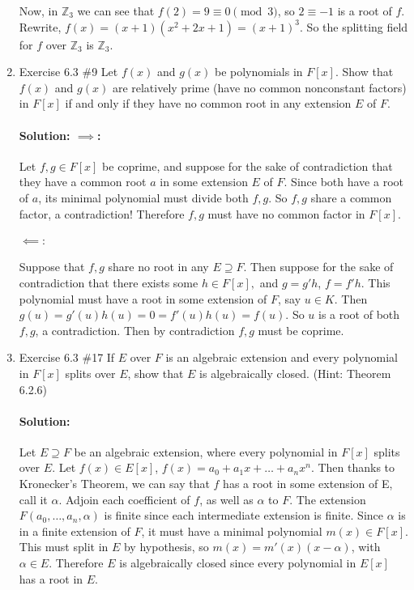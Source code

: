 \documentclass{article}
\begin{document}
\begin{enumerate}
Now, in $\mathbb{Z}_3$ we can see that $f(2)=9\equiv 0\pmod{3} $, so $2\equiv -1$ is a root of $f$. Rewrite, $f(x)=(x+1)(x^2+2x+1)=(x+1)^3$. So the splitting field
for $f$ over $\mathbb{Z}_3$ is $\mathbb{Z}_3$.

\newpage
\item Exercise 6.3 \#9 Let $f(x)$ and $g(x)$ be polynomials in $F[x].$ Show that $f(x)$ and $g(x)$
are relatively prime (have no common nonconstant factors) in $F[x]$ if and only if
they have no common root in any extension $E$ of $F.$

\paragraph{Solution: $\implies$: }
Let $f,g\in F[x]$ be coprime, and suppose for the sake of contradiction that they have a common root $a$
in some extension $E$ of $F$. Since both have a root of $a$, its minimal polynomial must divide both $f,g$.
So $f,g$ share a common factor, a contradiction!
Therefore $f,g$ must have no common factor in $F[x]$.
\paragraph{$\impliedby:$ }
Suppose that $f,g $ share no root in any $E\supseteq F$. Then suppose for the sake of contradiction that there exists some $h\in F[x],$ and $g=g'h$, $f=f'h$.
This polynomial must have a root in some extension of $F$, say $u\in K$. Then $g(u)=g'(u)h(u)=0=f'(u)h(u)=f(u)$. So $u$ is a root of both $f,g$, a contradiction. Then by contradiction
$f,g$ must be coprime. %

\item Exercise 6.3 \#17 If $E$ over $F$ is an algebraic extension and every polynomial in
$F[x]$ splits over $E$, show that $E$ is algebraically closed. (Hint: Theorem 6.2.6)

\paragraph{Solution: }Let $E\supseteq F$ be an algebraic extension, where every polynomial in $F[x]$ splits over $E$. 
Let $f(x)\in E[x]$, $f(x)=a_0+a_1x+\ldots+a_nx^{n}$.
Then thanks to Kronecker's Theorem, we can say that $f$ has a root in some extension of E, call it $\alpha$.
Adjoin each coefficient of $f$, as well as $\alpha$ to $F$. The extension $F(a_0,\ldots,a_n,\alpha)$ 
is finite since each intermediate extension is finite. Since $\alpha$ is in a finite extension of $F$, it 
must have a minimal polynomial $m(x)\in F[x]$. 
This must split in $E$ by hypothesis, so $m(x)=m'(x)(x-\alpha)$, with $\alpha\in E$. Therefore $E$ is algebraically closed since every polynomial in $E[x]$ has a root in $E$.

\end{enumerate}
\end{document}
